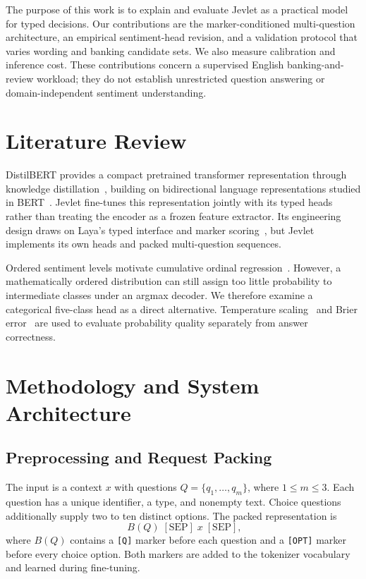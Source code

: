 \documentclass[conference]{IEEEtran}
\begin{document}
The purpose of this work is to explain and evaluate Jevlet as a practical model for typed decisions. Our contributions are the marker-conditioned multi-question architecture, an empirical sentiment-head revision, and a validation protocol that varies wording and banking candidate sets. We also measure calibration and inference cost. These contributions concern a supervised English banking-and-review workload; they do not establish unrestricted question answering or domain-independent sentiment understanding.

\section{Literature Review}
DistilBERT provides a compact pretrained transformer representation through knowledge distillation~\cite{distilbert}, building on bidirectional language representations studied in BERT~\cite{bert}. Jevlet fine-tunes this representation jointly with its typed heads rather than treating the encoder as a frozen feature extractor. Its engineering design draws on Laya's typed interface and marker scoring~\cite{laya}, but Jevlet implements its own heads and packed multi-question sequences.

Ordered sentiment levels motivate cumulative ordinal regression~\cite{coral}. However, a mathematically ordered distribution can still assign too little probability to intermediate classes under an argmax decoder. We therefore examine a categorical five-class head as a direct alternative. Temperature scaling~\cite{guo} and Brier error~\cite{brier} are used to evaluate probability quality separately from answer correctness.

\section{Methodology and System Architecture}
\subsection{Preprocessing and Request Packing}
The input is a context $x$ with questions $Q=\{q_1,\ldots,q_m\}$, where $1\leq m\leq3$. Each question has a unique identifier, a type, and nonempty text. Choice questions additionally supply two to ten distinct options. The packed representation is
\begin{equation}
[\mathrm{CLS}]\;B(Q)\;[\mathrm{SEP}]\;x\;[\mathrm{SEP}],
\end{equation}
where $B(Q)$ contains a \texttt{[Q]} marker before each question and a \texttt{[OPT]} marker before every choice option. Both markers are added to the tokenizer vocabulary and learned during fine-tuning.
\end{document}
